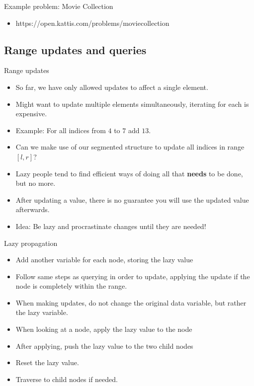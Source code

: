 \documentclass{beamer}
\begin{document}
\begin{frame}[plain]{Example problem: Movie Collection}
    \begin{itemize}
        \item https://open.kattis.com/problems/moviecollection
    \end{itemize}
\end{frame}

\subsection*{Range updates and queries}

\begin{frame}[plain]{Range updates}
    \begin{itemize}
        \item<1-> So far, we have only allowed updates to affect a single element.
        \item<2-> Might want to update multiple elements simultaneously, iterating for each is expensive.
        \item<3-> Example: For all indices from $4$ to $7$ add $13$.
        \item<4-> Can we make use of our segmented structure to update all indices in range $[l, r]$?
        \item<5-> Lazy people tend to find efficient ways of doing all that \textbf{needs} to be done, but no more.
        \item<6-> After updating a value, there is no guarantee you will use the updated value afterwards.
        \item<7-> Idea: Be lazy and procrastinate changes until they are needed!
    \end{itemize}
\end{frame}

\begin{frame}[plain]{Lazy propagation}
    \begin{itemize}
        \item<1-> Add another variable for each node, storing the lazy value
        \item<2-> Follow same steps as querying in order to update, applying the update if the node is completely within the range.
        \item<3-> When making updates, do not change the original data variable, but rather the lazy variable.
        \item<4-> When looking at a node, apply the lazy value to the node
        \item<5-> After applying, push the lazy value to the two child nodes
        \item<6-> Reset the lazy value.
        \item<7-> Traverse to child nodes if needed.
    \end{itemize}
\end{frame}
\end{document}
